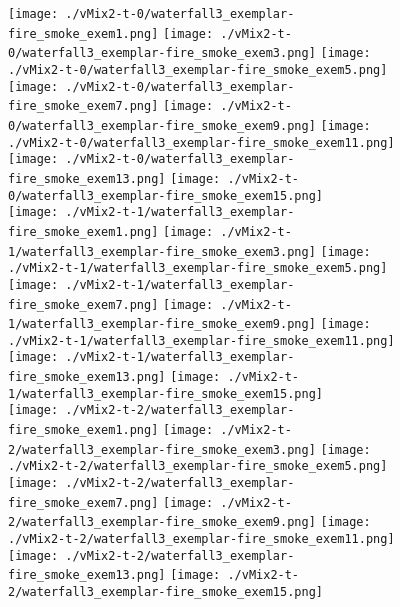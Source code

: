 \begin{figure}[ht!]
{\centering
    \texttt{[image: ./vMix2-t-0/waterfall3\_exemplar-fire\_smoke\_exem1.png]}
    \texttt{[image: ./vMix2-t-0/waterfall3\_exemplar-fire\_smoke\_exem3.png]}
    \texttt{[image: ./vMix2-t-0/waterfall3\_exemplar-fire\_smoke\_exem5.png]}
    \texttt{[image: ./vMix2-t-0/waterfall3\_exemplar-fire\_smoke\_exem7.png]}
    \texttt{[image: ./vMix2-t-0/waterfall3\_exemplar-fire\_smoke\_exem9.png]}
    \texttt{[image: ./vMix2-t-0/waterfall3\_exemplar-fire\_smoke\_exem11.png]}
    \texttt{[image: ./vMix2-t-0/waterfall3\_exemplar-fire\_smoke\_exem13.png]}
    \texttt{[image: ./vMix2-t-0/waterfall3\_exemplar-fire\_smoke\_exem15.png]} \\
\vspace{1mm}
    \texttt{[image: ./vMix2-t-1/waterfall3\_exemplar-fire\_smoke\_exem1.png]}
    \texttt{[image: ./vMix2-t-1/waterfall3\_exemplar-fire\_smoke\_exem3.png]}
    \texttt{[image: ./vMix2-t-1/waterfall3\_exemplar-fire\_smoke\_exem5.png]}
    \texttt{[image: ./vMix2-t-1/waterfall3\_exemplar-fire\_smoke\_exem7.png]}
    \texttt{[image: ./vMix2-t-1/waterfall3\_exemplar-fire\_smoke\_exem9.png]}
    \texttt{[image: ./vMix2-t-1/waterfall3\_exemplar-fire\_smoke\_exem11.png]}
    \texttt{[image: ./vMix2-t-1/waterfall3\_exemplar-fire\_smoke\_exem13.png]}
    \texttt{[image: ./vMix2-t-1/waterfall3\_exemplar-fire\_smoke\_exem15.png]} \\
\vspace{1mm}
    \texttt{[image: ./vMix2-t-2/waterfall3\_exemplar-fire\_smoke\_exem1.png]}
    \texttt{[image: ./vMix2-t-2/waterfall3\_exemplar-fire\_smoke\_exem3.png]}
    \texttt{[image: ./vMix2-t-2/waterfall3\_exemplar-fire\_smoke\_exem5.png]}
    \texttt{[image: ./vMix2-t-2/waterfall3\_exemplar-fire\_smoke\_exem7.png]}
    \texttt{[image: ./vMix2-t-2/waterfall3\_exemplar-fire\_smoke\_exem9.png]}
    \texttt{[image: ./vMix2-t-2/waterfall3\_exemplar-fire\_smoke\_exem11.png]}
    \texttt{[image: ./vMix2-t-2/waterfall3\_exemplar-fire\_smoke\_exem13.png]}
    \texttt{[image: ./vMix2-t-2/waterfall3\_exemplar-fire\_smoke\_exem15.png]} \\
}
\end{figure}
